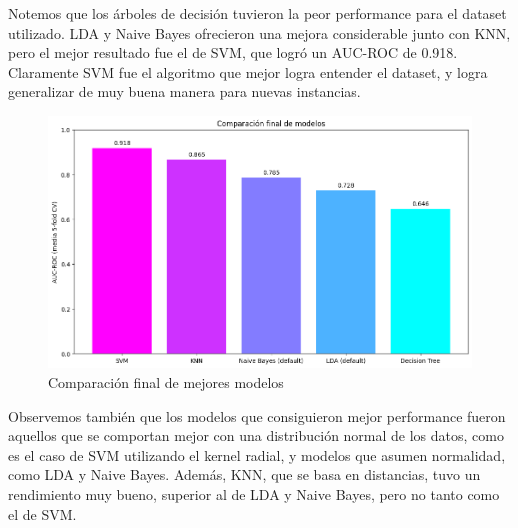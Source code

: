 Notemos que los árboles de decisión tuvieron la peor performance para el dataset utilizado. LDA y Naive Bayes ofrecieron una
mejora considerable junto con KNN, pero el mejor resultado fue el de SVM, que logró un AUC-ROC de 0.918. Claramente SVM fue el 
algoritmo que mejor logra entender el dataset, y logra generalizar de muy buena manera para nuevas instancias.

\begin{figure}[h]
    \centering
    \includegraphics[width=0.60\linewidth]{img/comparacion-modelos.png}
    \caption*{Comparación final de mejores modelos}
    \label{fig:comparacion-modelos} 
\end{figure}


Observemos también que los modelos que consiguieron mejor performance fueron aquellos que se comportan mejor con una distribución normal de los datos, como es el caso de SVM utilizando el kernel radial, y modelos que asumen normalidad, como LDA y Naive Bayes. Además, KNN, que se basa en distancias, tuvo un rendimiento muy bueno, 
superior al de LDA y Naive Bayes, pero no tanto como el de SVM.